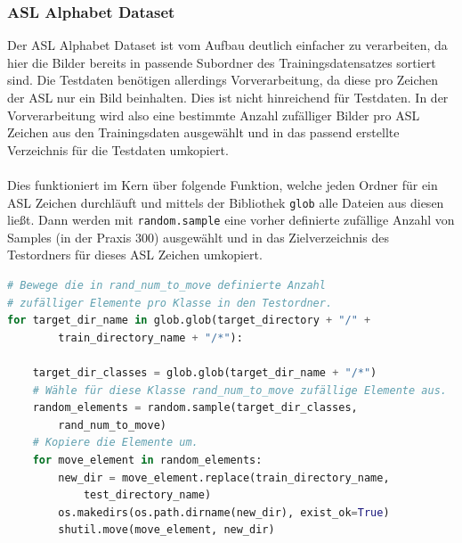 \documentclass[11pt,bibliography=totocnumbered]{scrartcl}
\begin{document}
\subsubsection{ASL Alphabet Dataset}
\label{aslpreparation}
Der ASL Alphabet Dataset ist vom Aufbau deutlich einfacher zu verarbeiten, da hier die Bilder bereits in passende Subordner des Trainingsdatensatzes sortiert sind. Die Testdaten benötigen allerdings Vorverarbeitung, da diese pro Zeichen der ASL nur ein Bild beinhalten. Dies ist nicht hinreichend für Testdaten. In der Vorverarbeitung wird also eine bestimmte Anzahl zufälliger Bilder pro ASL Zeichen aus den Trainingsdaten ausgewählt und in das passend erstellte Verzeichnis für die Testdaten umkopiert.
\\\\
Dies funktioniert im Kern über folgende Funktion, welche jeden Ordner für ein ASL Zeichen durchläuft und mittels der Bibliothek \lstinline[language=pythoninline]|glob| alle Dateien aus diesen ließt. Dann werden mit \lstinline[language=pythoninline]|random.sample| eine vorher definierte zufällige Anzahl von Samples (in der Praxis 300) ausgewählt und in das Zielverzeichnis des Testordners für dieses ASL Zeichen umkopiert.
\begin{lstlisting}[language=python,firstnumber=44,caption={Kern der Sign Language MNIST Dataset Vorverarbeitung.},label=lst:to_image_at_dir]
# Bewege die in rand_num_to_move definierte Anzahl 
# zufälliger Elemente pro Klasse in den Testordner.
for target_dir_name in glob.glob(target_directory + "/" + 
		train_directory_name + "/*"):
	
	target_dir_classes = glob.glob(target_dir_name + "/*")
	# Wähle für diese Klasse rand_num_to_move zufällige Elemente aus.
	random_elements = random.sample(target_dir_classes, 
		rand_num_to_move)
	# Kopiere die Elemente um.
	for move_element in random_elements:
		new_dir = move_element.replace(train_directory_name, 
			test_directory_name)
		os.makedirs(os.path.dirname(new_dir), exist_ok=True)
		shutil.move(move_element, new_dir)
\end{lstlisting}
\end{document}
